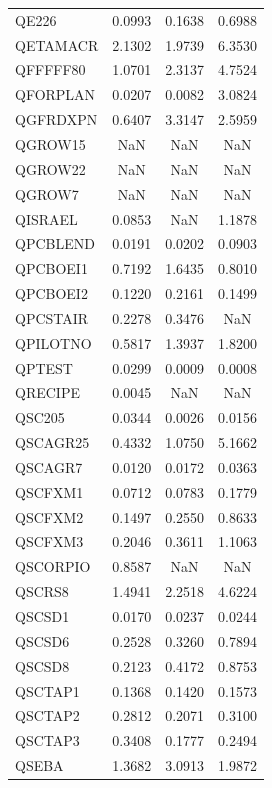 \begin{longtable}{lccc}
QE226    &   0.0993 &   0.1638 &   0.6988 \\
QETAMACR &   2.1302 &   1.9739 &   6.3530 \\
QFFFFF80 &   1.0701 &   2.3137 &   4.7524 \\
QFORPLAN &   0.0207 &   0.0082 &   3.0824 \\
QGFRDXPN &   0.6407 &   3.3147 &   2.5959 \\
QGROW15  &      NaN &      NaN &      NaN \\
QGROW22  &      NaN &      NaN &      NaN \\
QGROW7   &      NaN &      NaN &      NaN \\
QISRAEL  &   0.0853 &      NaN &   1.1878 \\
QPCBLEND &   0.0191 &   0.0202 &   0.0903 \\
QPCBOEI1 &   0.7192 &   1.6435 &   0.8010 \\
QPCBOEI2 &   0.1220 &   0.2161 &   0.1499 \\
QPCSTAIR &   0.2278 &   0.3476 &      NaN \\
QPILOTNO &   0.5817 &   1.3937 &   1.8200 \\
QPTEST   &   0.0299 &   0.0009 &   0.0008 \\
QRECIPE  &   0.0045 &      NaN &      NaN \\
QSC205   &   0.0344 &   0.0026 &   0.0156 \\
QSCAGR25 &   0.4332 &   1.0750 &   5.1662 \\
QSCAGR7  &   0.0120 &   0.0172 &   0.0363 \\
QSCFXM1  &   0.0712 &   0.0783 &   0.1779 \\
QSCFXM2  &   0.1497 &   0.2550 &   0.8633 \\
QSCFXM3  &   0.2046 &   0.3611 &   1.1063 \\
QSCORPIO &   0.8587 &      NaN &      NaN \\
QSCRS8   &   1.4941 &   2.2518 &   4.6224 \\
QSCSD1   &   0.0170 &   0.0237 &   0.0244 \\
QSCSD6   &   0.2528 &   0.3260 &   0.7894 \\
QSCSD8   &   0.2123 &   0.4172 &   0.8753 \\
QSCTAP1  &   0.1368 &   0.1420 &   0.1573 \\
QSCTAP2  &   0.2812 &   0.2071 &   0.3100 \\
QSCTAP3  &   0.3408 &   0.1777 &   0.2494 \\
QSEBA    &   1.3682 &   3.0913 &   1.9872 \\

\end{longtable}
